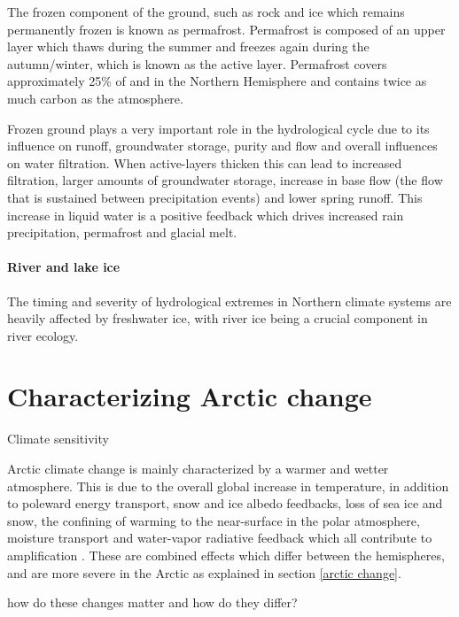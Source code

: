\documentclass[11pt, oneside]{article}
\begin{document}
The frozen component of the ground, such as rock and ice which remains permanently frozen is known as permafrost. Permafrost is composed of an upper layer which thaws during the summer and freezes again during the autumn/winter, which is known as the active layer. Permafrost covers approximately 25\% of and in the Northern Hemisphere and contains twice as much carbon as the atmosphere. 


Frozen ground plays a very important role in the hydrological cycle due to its influence on runoff, groundwater storage, purity and flow and overall influences on water filtration. When active-layers thicken this can lead to 
increased filtration, larger amounts of groundwater storage, increase in base flow (the flow that is sustained between precipitation events) and lower spring runoff. This increase in liquid water is a positive feedback which drives increased rain precipitation, permafrost and glacial melt. 



\paragraph{River and lake ice}
The timing and severity of hydrological extremes in Northern climate systems are heavily affected by freshwater ice, with river ice being a crucial component in river ecology.




\section{Characterizing Arctic change}
Climate sensitivity 

Arctic climate change is mainly characterized by a warmer and wetter atmosphere. This is due to the overall global increase in temperature, in addition to poleward energy transport, snow and ice albedo feedbacks, loss of sea ice and snow, the confining of warming to the near-surface in the polar atmosphere, moisture transport and water-vapor radiative feedback which all contribute to amplification \cite{serreze2011processes}. These are combined effects which differ between the hemispheres, and are more severe in the Arctic as explained in section \ref{arctic change}.

{\color{blue}how do these changes matter and how do they differ?}
\end{document}
